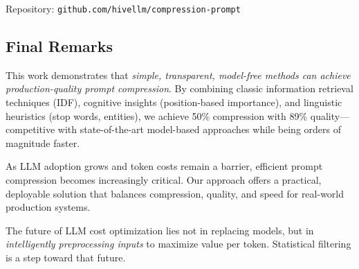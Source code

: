Repository: \texttt{github.com/hivellm/compression-prompt}

\subsection{Final Remarks}

This work demonstrates that \textit{simple, transparent, model-free methods can achieve production-quality prompt compression}. By combining classic information retrieval techniques (IDF), cognitive insights (position-based importance), and linguistic heuristics (stop words, entities), we achieve 50\% compression with 89\% quality—competitive with state-of-the-art model-based approaches while being orders of magnitude faster.

As LLM adoption grows and token costs remain a barrier, efficient prompt compression becomes increasingly critical. Our approach offers a practical, deployable solution that balances compression, quality, and speed for real-world production systems.

The future of LLM cost optimization lies not in replacing models, but in \textit{intelligently preprocessing inputs} to maximize value per token. Statistical filtering is a step toward that future.
